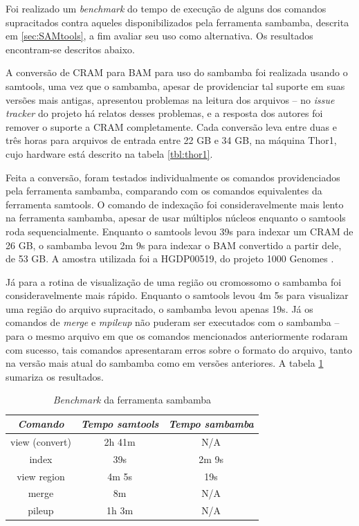 \documentclass[cic,tc]{iiufrgs}
\begin{document}
{Foi realizado um \textit{benchmark} do tempo de execução de alguns dos comandos
supracitados contra aqueles disponibilizados pela ferramenta sambamba, descrita
em \ref{sec:SAMtools}, a fim avaliar seu uso como alternativa. Os resultados
encontram-se descritos abaixo.

A conversão de CRAM para BAM para uso do sambamba foi realizada usando o
samtools, uma vez que o sambamba, apesar de providenciar tal suporte em suas
versões mais antigas, apresentou problemas na leitura dos arquivos -- no
\textit{issue tracker} do projeto há relatos desses problemas, e a resposta dos
autores foi remover o suporte a CRAM completamente. Cada conversão leva entre
duas e três horas para arquivos de entrada entre 22 GB e 34 GB, na máquina
Thor1, cujo hardware está descrito na tabela \ref{tbl:thor1}.

Feita a conversão, foram testados individualmente os comandos providenciados
pela ferramenta sambamba, comparando com os comandos equivalentes da ferramenta
samtools. O comando de indexação foi consideravelmente mais lento na ferramenta
sambamba, apesar de usar múltiplos núcleos enquanto o samtools roda
sequencialmente. Enquanto o samtools levou 39s para indexar um CRAM de 26 GB, o
sambamba levou 2m 9s para indexar o BAM convertido a partir dele, de 53 GB. A
amostra utilizada foi a HGDP00519, do projeto 1000 Genomes \cite{via20101000}.

Já para a rotina de visualização de uma região ou cromossomo o sambamba foi
consideravelmente mais rápido. Enquanto o samtools levou 4m 5s para visualizar
uma região do arquivo supracitado, o sambamba levou apenas 19s. Já os comandos
de \textit{merge} e \textit{mpileup} não puderam ser executados com o sambamba
-- para o mesmo arquivo em que os comandos mencionados anteriormente rodaram
com sucesso, tais comandos apresentaram erros sobre o formato do arquivo, tanto
na versão mais atual do sambamba como em versões anteriores. A tabela
\ref{tbl:sambamba} sumariza os resultados.

\begin{table}[h]
  \caption{\textit{Benchmark} da ferramenta sambamba}
    \centering
        \begin{tabular}{c|c|c}
          \hline
          \textit{Comando}  &   \textit{Tempo samtools}  & \textit{Tempo sambamba} \\
          \hline
          \hline
          view (convert) & 2h 41m & N/A \\
          index & 39s & 2m 9s \\
          view region & 4m 5s & 19s \\
          merge & 8m & N/A \\
          pileup & 1h 3m & N/A \\
          \hline
        \end{tabular}
    \label{tbl:sambamba}
\end{table}

}
\end{document}
